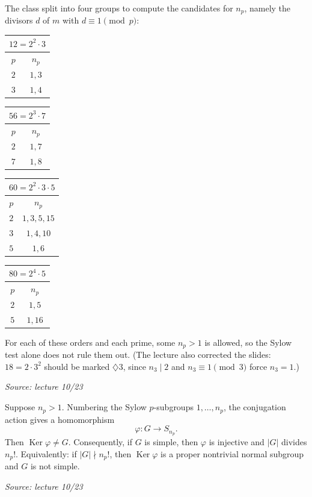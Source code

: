 \documentclass[11pt]{report}
\newcommand{\srcline}[1]{\par\hfill{\footnotesize\textit{Source: #1}}}
\begin{document}
\begin{exbox}\label{ex:four-orders-survive}
The class split into four groups to compute the candidates for $n_p$, namely the divisors $d$ of $m$ with $d \equiv 1 \pmod p$:
\begin{center}
\renewcommand{\arraystretch}{1.15}
\begin{tabular}{c|c}
\multicolumn{2}{c}{$12 = 2^2 \cdot 3$} \\ \hline
$p$ & $n_p$ \\ \hline
$2$ & $1, 3$ \\
$3$ & $1, 4$
\end{tabular}
\qquad
\begin{tabular}{c|c}
\multicolumn{2}{c}{$56 = 2^3 \cdot 7$} \\ \hline
$p$ & $n_p$ \\ \hline
$2$ & $1, 7$ \\
$7$ & $1, 8$
\end{tabular}
\qquad
\begin{tabular}{c|c}
\multicolumn{2}{c}{$60 = 2^2 \cdot 3 \cdot 5$} \\ \hline
$p$ & $n_p$ \\ \hline
$2$ & $1, 3, 5, 15$ \\
$3$ & $1, 4, 10$ \\
$5$ & $1, 6$
\end{tabular}
\qquad
\begin{tabular}{c|c}
\multicolumn{2}{c}{$80 = 2^4 \cdot 5$} \\ \hline
$p$ & $n_p$ \\ \hline
$2$ & $1, 5$ \\
$5$ & $1, 16$
\end{tabular}
\end{center}
For each of these orders and each prime, some $n_p > 1$ is allowed, so the Sylow test alone does not rule them out. (The lecture also corrected the slides: $18 = 2 \cdot 3^2$ should be marked $\diamondsuit 3$, since $n_3 \mid 2$ and $n_3 \equiv 1 \pmod 3$ force $n_3 = 1$.)
\srcline{lecture 10/23}
\end{exbox}

\begin{propbox}\label{prop:conjugation-hom-sylow}
Suppose $n_p > 1$. Numbering the Sylow $p$-subgroups $1, \ldots, n_p$, the conjugation action gives a homomorphism
\[ \varphi: G \to S_{n_p}. \]
Then $\operatorname{Ker}\varphi \neq G$. Consequently, if $G$ is simple, then $\varphi$ is injective and $|G|$ divides $n_p!$. Equivalently: if $|G| \nmid n_p!$, then $\operatorname{Ker}\varphi$ is a proper nontrivial normal subgroup and $G$ is not simple.
\srcline{lecture 10/23}
\end{propbox}
\end{document}
